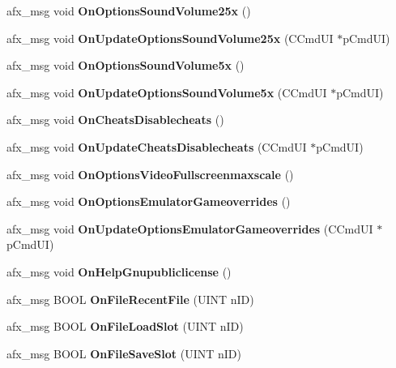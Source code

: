 \begin{DoxyCompactItemize}
\mbox{\label{class_main_wnd_a023f468053008a509a35b2a08a7661ee}} 
afx\+\_\+msg void {\bfseries On\+Options\+Sound\+Volume25x} ()
\item 
\mbox{\label{class_main_wnd_a87b6c7456e128d8d0740c7265a080285}} 
afx\+\_\+msg void {\bfseries On\+Update\+Options\+Sound\+Volume25x} (C\+Cmd\+UI $\ast$p\+Cmd\+UI)
\item 
\mbox{\label{class_main_wnd_a1f06aa4d5d0a115db396574ec2fc7f02}} 
afx\+\_\+msg void {\bfseries On\+Options\+Sound\+Volume5x} ()
\item 
\mbox{\label{class_main_wnd_ae343c11545af1642af98dfa03584e114}} 
afx\+\_\+msg void {\bfseries On\+Update\+Options\+Sound\+Volume5x} (C\+Cmd\+UI $\ast$p\+Cmd\+UI)
\item 
\mbox{\label{class_main_wnd_a0bd860492fa9bd1b58a3baf46bda6cad}} 
afx\+\_\+msg void {\bfseries On\+Cheats\+Disablecheats} ()
\item 
\mbox{\label{class_main_wnd_a7eae676f3ed65c790243e6a051c554c0}} 
afx\+\_\+msg void {\bfseries On\+Update\+Cheats\+Disablecheats} (C\+Cmd\+UI $\ast$p\+Cmd\+UI)
\item 
\mbox{\label{class_main_wnd_a31678f98dfdc982e2f4e242293fc85e0}} 
afx\+\_\+msg void {\bfseries On\+Options\+Video\+Fullscreenmaxscale} ()
\item 
\mbox{\label{class_main_wnd_a219c1f71e6f873fc5f48d19fe6ce36ac}} 
afx\+\_\+msg void {\bfseries On\+Options\+Emulator\+Gameoverrides} ()
\item 
\mbox{\label{class_main_wnd_ae8b5a29533bf12488647e91737a775c0}} 
afx\+\_\+msg void {\bfseries On\+Update\+Options\+Emulator\+Gameoverrides} (C\+Cmd\+UI $\ast$p\+Cmd\+UI)
\item 
\mbox{\label{class_main_wnd_ac0666597df52e2525a34d65f9795db75}} 
afx\+\_\+msg void {\bfseries On\+Help\+Gnupubliclicense} ()
\item 
\mbox{\label{class_main_wnd_a0d7f7d468e486be90f1b6771bff84846}} 
afx\+\_\+msg B\+O\+OL {\bfseries On\+File\+Recent\+File} (U\+I\+NT n\+ID)
\item 
\mbox{\label{class_main_wnd_a84c4154350bd26b393fcd82948d342e1}} 
afx\+\_\+msg B\+O\+OL {\bfseries On\+File\+Load\+Slot} (U\+I\+NT n\+ID)
\item 
\mbox{\label{class_main_wnd_aa10e0e321035d0cd1e1e953529df5f19}} 
afx\+\_\+msg B\+O\+OL {\bfseries On\+File\+Save\+Slot} (U\+I\+NT n\+ID)
\end{DoxyCompactItemize}


